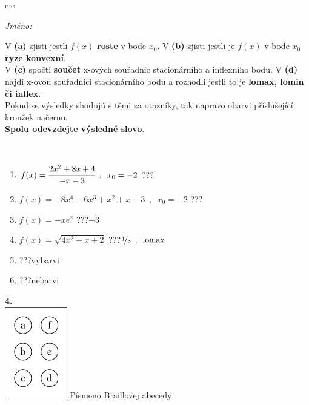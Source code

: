 \documentclass[10pt]{report}
\begin{document}
\begin{tabular}{c:c}
\begin{minipage}[c][104.5mm][t]{0.5\linewidth}
\begin{center}
\textit{Jméno:}\phantom{xxxxxxxxxxxxxxxxxxxxxxxxxxxxxxxxxxxxxxxxxxxxxxxxxxxxxxxxxxxxxxxxx}\\[5mm]
\begin{minipage}{0.95\linewidth}
\begin{center}
{\small V \textbf{(a)} zjisti jestli $f(x)$ \textbf{roste} v bode $x_0$. V \textbf{(b)} zjisti jestli je $f(x)$ v bode $x_0$ \textbf{ryze konvexní}.\\V \textbf{(c)} spočti \textbf{součet} x-ových souřadnic stacionárního a inflexního bodu. V \textbf{(d)} najdi x-ovou souřadnici stacionárního bodu a rozhodli jestli to je \textbf{lomax, lomin či inflex}.\\Pokud se výsledky shodujú s těmi za otazníky, tak napravo obarvi příslušející kroužek načerno.\\\textbf{Spolu odevzdejte výsledné slovo}}.
\end{center}
\end{minipage}
\\[1mm]
\begin{minipage}{0.79\linewidth}
\begin{center}
\begin{varwidth}{\linewidth}
\begin{enumerate}
\normalsize
\item $f(x)=\cfrac{2x^2+8x+4}{-x-3}\enspace , \enspace x_0=-2$\quad \dotfill\; ???\;\dotfill \quad {}
\item $f(x)=-8x^4-6x^3+x^2+x-3\enspace , \enspace x_0=-2$\quad \dotfill\; ???\;\dotfill \quad {}
\item $f(x)=-xe^{x}$\quad \dotfill\; ???\;\dotfill \quad $-3$
\item $f(x)=\sqrt{4x^2-x+2}$\quad \dotfill\; ???\;\dotfill \quad $\nicefrac{1}{8}\enspace , \enspace\mathrm{lomax}$
\item \quad \dotfill\; ???\;\dotfill \quad vybarvi
\item \quad \dotfill\; ???\;\dotfill \quad nebarvi
\end{enumerate}
\end{varwidth}
\end{center}
\end{minipage}
\begin{minipage}{0.20\linewidth}
\begin{center}
{\Huge\bfseries 4.} \\[2mm]
\includegraphics[height=40mm]{../images/braille.png}
{\small Písmeno Braillovej abecedy}
\end{center}
\end{minipage}
\end{center}
\end{minipage}
%
\end{tabular}
\end{document}
